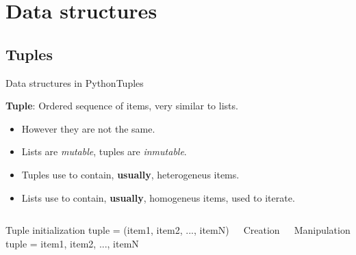 \documentclass[10pt,compress]{beamer} %
\begin{document}
\section{Data structures}

\subsection{Tuples}
\begin{frame}{Data structures in Python}{Tuples}

	\textbf{Tuple}: Ordered sequence of items, very similar to lists.
		\begin{itemize}
		\item \small However they are not the same.
		\item \small Lists are \textit{mutable}, tuples are \textit{inmutable}.
		\item \small Tuples use to contain, \textbf{usually}, heterogeneus items.
		\item \small Lists use to contain, \textbf{usually}, homogeneus items, used to iterate.
		\end{itemize}
	
	    \begin{columns}
		\begin{block}{Tuple initialization}
        tuple = (item1, item2, ..., itemN)\\
        tuple = item1, item2, ..., itemN
		\end{block}

 	   \scriptsize{
		\begin{exampleblock}{Creation}
		\vspace{-0.2cm}
		
		\vspace{-0.2cm}
		\end{exampleblock}
		}
       \vspace{4cm}
 	   \scriptsize{
		\begin{exampleblock}{Manipulation}
		\vspace{-0.2cm}
		
		\vspace{-0.3cm}	
		\end{exampleblock}
		}
		\vspace{2.9 cm}

	\end{columns}
\end{frame}
\end{document}
